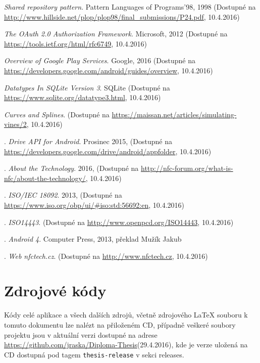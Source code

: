 \documentclass[czech,master,public,dept460,male,java,cpdeclaration]{diploma}
\begin{document}
\begin{thebibliography}{99}
\textit{Shared repository pattern}. {Pattern Languages of Programs'98, 1998}
\newline(Dostupné na \url{http://www.hillside.net/plop/plop98/final_submissions/P24.pdf}, 10.4.2016)

\textit{The OAuth 2.0 Authorization Framework}. {Microsoft, 2012
\newline(Dostupné na \url{https://tools.ietf.org/html/rfc6749}, 10.4.2016)}

\textit{Overview of Google Play Services}. {Google, 2016
\newline(Dostupné na \url{https://developers.google.com/android/guides/overview}, 10.4.2016)}

\textit{Datatypes In SQLite Version 3}. {SQLite
\newline(Dostupné na \url{https://www.sqlite.org/datatype3.html}, 10.4.2016)}


\textit{Curves and Splines}.
\newline(Dostupné na \url{https://maissan.net/articles/simulating-vines/2}, 10.4.2016)



.
\textit{Drive API for Android}. {Prosinec 2015,
\newline(Dostupné na \url{https://developers.google.com/drive/android/appfolder}, 10.4.2016)}

.
\textit{About the Technology}. {2016,
\newline(Dostupné na \url{http://nfc-forum.org/what-is-nfc/about-the-technology/}, 10.4.2016)}

.
\textit{ISO/IEC 18092}. {2013,
\newline(Dostupné na \url{https://www.iso.org/obp/ui/#iso:std:56692:en}, 10.4.2016)}


.
\textit{ISO14443}. {
\newline(Dostupné na \url{http://www.openpcd.org/ISO14443}, 10.4.2016)}

.
\textit{Android 4}. {Computer Press, 2013, překlad Mužík Jakub}

.
\textit{Web nfctech.cz}. {
\newline(Dostupné na \url{http://www.nfctech.cz}, 10.4.2016)}

\end{thebibliography}

  \appendix

  \section{Zdrojové kódy}
  Kódy celé aplikace a všech dalších zdrojů, včetně zdrojového \mbox{\LaTeX}
  souboru k tomuto dokumentu
   lze nalézt na přiloženém CD, případně veškeré soubory
  projektu jsou v aktuální verzi dostupné na adrese \url{https://github.com/jraska/Diploma-Thesis}(29.4.2016),
  kde je verze uložená na CD dostupná pod tagem \texttt{thesis-release} v sekci releases.
\end{document}
